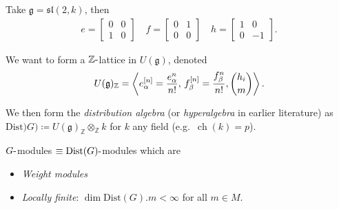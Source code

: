 \begin{example}

Take \({\mathfrak{g}}= {\mathfrak{sl}}(2, k)\), then
\begin{align*}  
e = \begin{bmatrix}
0 & 0 \\
1 & 0
\end{bmatrix}
\quad 
f = \begin{bmatrix}
0 & 1 \\
0 & 0
\end{bmatrix}
\quad
h = \begin{bmatrix}
1 & 0 \\
0 & -1
\end{bmatrix}
.\end{align*}

\end{example}

We want to form a \({\mathbb{Z}}{\hbox{-}}\)lattice in
\(U({\mathfrak{g}})\), denoted
\begin{align*}  
U({\mathfrak{g}})_{\mathbb{Z}}
=
\left\langle{
e_\alpha^{[n]} = {e_\alpha^n \over n!},\, f_\beta^{[n]} = {f_\beta^n \over n!}, {h_i \choose m}
}\right\rangle
.\end{align*}

We then form the \emph{distribution algebra} (or \emph{hyperalgebra} in
earlier literature) as
\(\mathrm{Dist})G) \coloneqq U({\mathfrak{g}})_{\mathbb{Z}}\otimes_{\mathbb{Z}}k\)
for \(k\) any field (e.g.~\(\operatorname{ch}(k) = p\)).

\begin{theorem}[?]

\(G{\hbox{-}}\)modules \(\equiv \mathrm{Dist}(G){\hbox{-}}\)modules
which are

\begin{itemize}
\tightlist
\item
  \emph{Weight modules}
\item
  \emph{Locally finite}: \(\dim \mathrm{Dist}(G).m < \infty\) for all
  \(m\in M\).
\end{itemize}

\end{theorem}

